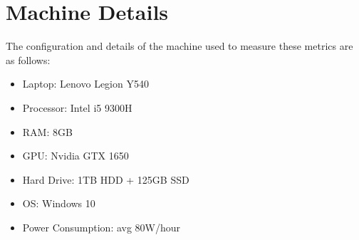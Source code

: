 \section{Machine Details}
\label{machine-details}
The configuration and details of the machine used to measure these metrics are as follows:

\begin{itemize}
    \item Laptop: Lenovo Legion Y540
    \item Processor: Intel i5 9300H
    \item RAM: 8GB
    \item GPU: Nvidia GTX 1650
    \item Hard Drive: 1TB HDD + 125GB SSD
    \item OS: Windows 10
    \item Power Consumption: avg 80W/hour
\end{itemize}